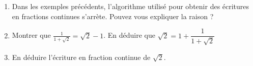 \begin{example}\label{chapitre02:exemple:fractioncontinues:racine4}\hfill 
	\begin{enumerate}[label={\alph*)}, leftmargin=*]
		\item Dans les exemples précédents, l'algorithme utilisé pour obtenir des écritures en fractions continues s'arrète. Pouvez vous expliquer la raison ?
		\item Montrer que $\frac{1}{1+\sqrt{2}}=\sqrt{2}-1$.  En déduire que $\sqrt{2}=1+\dfrac{1}{1+\sqrt{2}}$
		\item En déduire l'écriture en fraction continue de $\sqrt{2}$.
	\end{enumerate}

\end{example}


